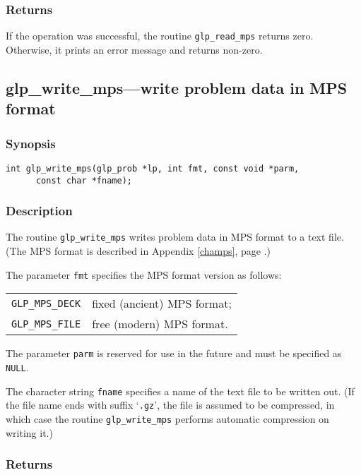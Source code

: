 \subsubsection*{Returns}

If the operation was successful, the routine \verb|glp_read_mps|
returns zero. Otherwise, it prints an error message and returns
non-zero.

\subsection{glp\_write\_mps---write problem data in MPS format}

\subsubsection*{Synopsis}

\begin{verbatim}
int glp_write_mps(glp_prob *lp, int fmt, const void *parm,
      const char *fname);
\end{verbatim}

\subsubsection*{Description}

The routine \verb|glp_write_mps| writes problem data in MPS format to a
text file. (The MPS format is described in Appendix \ref{champs}, page
\pageref{champs}.)

The parameter \verb|fmt| specifies the MPS format version as follows:

\begin{tabular}{@{}ll}
\verb|GLP_MPS_DECK| & fixed (ancient) MPS format; \\
\verb|GLP_MPS_FILE| & free (modern) MPS format. \\
\end{tabular}

The parameter \verb|parm| is reserved for use in the future and must be
specified as \verb|NULL|.

The character string \verb|fname| specifies a name of the text file to
be written out. (If the file name ends with suffix `\verb|.gz|', the
file is assumed to be compressed, in which case the routine
\verb|glp_write_mps| performs automatic compression on writing it.)

\subsubsection*{Returns}

